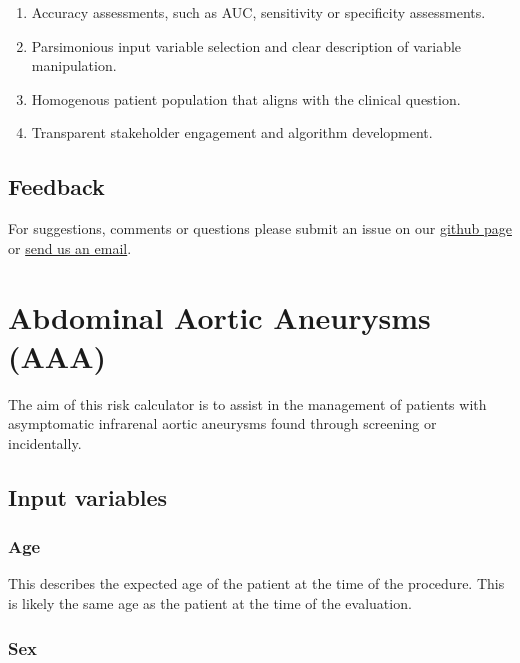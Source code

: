 \documentclass[
]{book}
\providecommand{\tightlist}{%
  \setlength{\itemsep}{0pt}\setlength{\parskip}{0pt}}
\begin{document}
\begin{enumerate}
\def\labelenumi{\arabic{enumi}.}
\tightlist
\item
  Accuracy assessments, such as AUC, sensitivity or specificity assessments.
\item
  Parsimonious input variable selection and clear description of variable manipulation.
\item
  Homogenous patient population that aligns with the clinical question.
\item
  Transparent stakeholder engagement and algorithm development.
\end{enumerate}

\hypertarget{feedback}{%
\section{Feedback}\label{feedback}}

For suggestions, comments or questions please submit an issue on our \href{https://github.com/adam-mdmph/vascalc/issues}{github page} or \href{mailto:vascularcalculator@gmail.com}{send us an email}.

\hypertarget{aaa}{%
\chapter{Abdominal Aortic Aneurysms (AAA)}\label{aaa}}

The aim of this risk calculator is to assist in the management of patients with asymptomatic infrarenal aortic aneurysms found through screening or incidentally.

\hypertarget{input-variables}{%
\section{Input variables}\label{input-variables}}

\hypertarget{age}{%
\subsection{Age}\label{age}}

This describes the expected age of the patient at the time of the procedure. This is likely the same age as the patient at the time of the evaluation.

\hypertarget{sex}{%
\subsection{Sex}\label{sex}}
\end{document}
